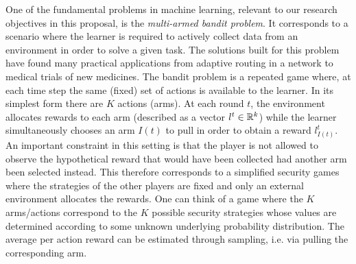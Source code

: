 One of the fundamental problems in machine learning, relevant to our research objectives in this proposal, is the \textit{multi-armed bandit problem}. It corresponds to a scenario where the learner is required to actively collect data from an environment in order to solve a given task. The solutions built for this problem have found many practical applications from adaptive routing in a network to medical trials of new medicines\cite{bubeck2012regret}.  
The bandit problem is a repeated game where, at each time step the same (fixed) set of actions is available to the learner.  
In its simplest form there are $K$ actions (arms). At each round $t$, the environment allocates rewards to each arm (described as a vector $l^t\in\mathbb{R}^k$) while the learner simultaneously chooses an arm $I(t)$ to pull in order to obtain a reward $l^t_{I(t)}$. An important constraint in this setting is that the player is not allowed to observe the hypothetical reward that would have been collected had another arm been selected instead. This therefore corresponds to a simplified security games where the strategies of the other players are fixed and only an external environment allocates the rewards. One can think of a game where the $K$ arms/actions correspond to the $K$ possible security strategies whose values are determined according to some unknown underlying probability distribution. 
The average per action reward can be estimated through sampling, i.e. via pulling the corresponding arm. 
  



